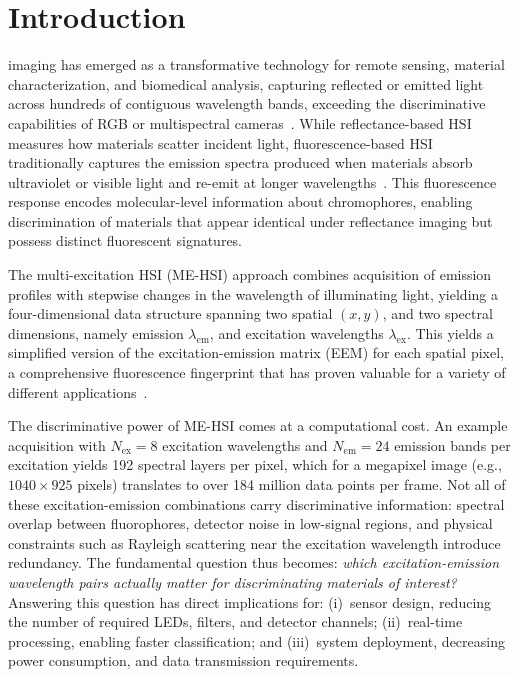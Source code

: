 \section{Introduction}
\label{sec:introduction}

 imaging has emerged as a transformative technology for remote sensing, material characterization, and biomedical analysis, capturing reflected or emitted light across hundreds of contiguous wavelength bands, exceeding the discriminative capabilities of RGB or multispectral cameras~\cite{plaza2009recent,bioucas2013hyperspectral}.
While reflectance-based HSI measures how materials scatter
incident light, fluorescence-based HSI traditionally captures the emission spectra produced when materials absorb ultraviolet or visible light and re-emit at longer wavelengths~\cite{lakowicz2006principles}.
This fluorescence response encodes molecular-level information about chromophores, enabling discrimination of materials that appear identical under reflectance imaging but possess distinct fluorescent signatures.

The multi-excitation HSI (ME-HSI) approach combines
acquisition of emission profiles with stepwise changes in the
wavelength of illuminating light, yielding a four-dimensional data structure spanning two spatial $(x, y)$, and two spectral dimensions, namely emission $\lambda_{\text{em}}$, and excitation wavelengths $\lambda_{\text{ex}}$.
This yields a simplified version of the excitation-emission matrix (EEM) for each spatial pixel, a comprehensive fluorescence fingerprint that has proven valuable for a variety of different applications~\cite{lakowicz2006principles}.

The discriminative power of ME-HSI comes at a computational cost.
An example acquisition with $N_{\text{ex}} = 8$ excitation wavelengths and $N_{\text{em}} = 24$ emission bands per excitation yields 192 spectral layers per pixel, which for a megapixel image (e.g., $1040 \times 925$ pixels) translates to over 184 million data points per frame.
Not all of these excitation-emission combinations carry discriminative information: spectral overlap between fluorophores, detector noise in low-signal regions, and physical constraints such as Rayleigh scattering near the excitation wavelength introduce redundancy.
The fundamental question thus becomes: \emph{which excitation-emission wavelength pairs actually matter for discriminating materials of interest?}
Answering this question has direct implications for:
(i)~sensor design, reducing the number of required LEDs, filters, and detector channels;
(ii)~real-time processing, enabling faster classification; and
(iii)~system deployment, decreasing power consumption, and data transmission requirements.


